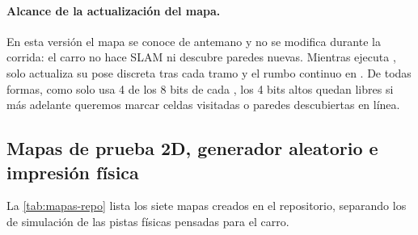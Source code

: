 \paragraph{Alcance de la actualización del mapa.}
En esta versión el mapa se conoce de antemano y no se modifica durante la corrida: el carro no hace SLAM ni descubre paredes nuevas. Mientras ejecuta , solo actualiza su pose discreta  tras cada tramo y el rumbo continuo en . De todas formas, como  solo usa 4 de los 8 bits de cada , los 4 bits altos quedan libres si más adelante queremos marcar celdas visitadas o paredes descubiertas en línea.

\subsection{Mapas de prueba 2D, generador aleatorio e impresión física}
\label{subsec:mapas-generacion-impresion}

La \cref{tab:mapas-repo} lista los siete mapas creados en el repositorio, separando los de simulación de las pistas físicas pensadas para el carro.

